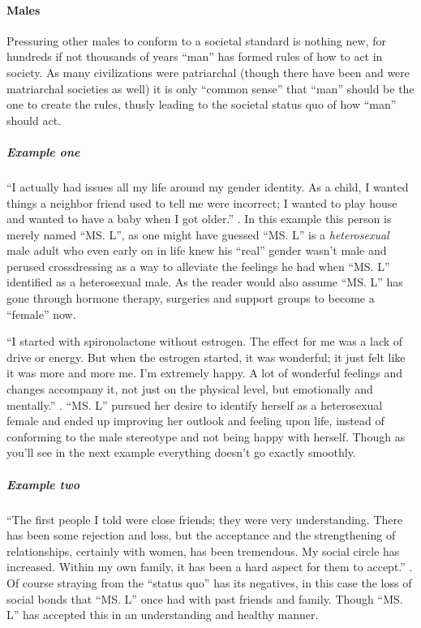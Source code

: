 \paragraph{Males}
Pressuring other males to conform to a societal standard is nothing new, for
hundreds if not thousands of years ``man'' has formed rules of how to act in
society. As many civilizations were patriarchal (though there have been and were
matriarchal societies as well) it is only ``common sense'' that ``man'' should
be the one to create the rules, thusly leading to the societal status quo of how
``man'' should act.
\par

\subparagraph{Example one}
``I actually had issues all my life around my gender identity. As a child,
I wanted things a neighbor friend used to tell me were incorrect; I wanted to
play house and wanted to have a baby when I got older.'' \cite[p.~478]{MOT}.
In this example this person is merely named ``MS. L'', as one might have guessed
``MS. L'' is a \textit{heterosexual} male adult who even early on in life knew his
``real'' gender wasn't male and perused crossdressing as a way to alleviate the
feelings he had when ``MS. L'' identified as a heterosexual male. As the reader
would also assume ``MS. L'' has gone through hormone therapy, surgeries and
support groups to become a ``female'' now.
\newpage

``I started with spironolactone without estrogen. The effect for me was a lack
of drive or energy. But when the estrogen started, it was wonderful; it just
felt like it was more and more me. I’m extremely happy. A lot of wonderful
feelings and changes accompany it, not just on the physical level, but
emotionally and mentally.'' \cite[p.~479]{MOT} . ``MS. L'' pursued her desire to
identify herself as a heterosexual female and ended up improving her outlook and
feeling upon life, instead of conforming to the male stereotype and not being
happy with herself. Though as you'll see in the next example everything doesn't
go exactly smoothly.
\par

\subparagraph{Example two}
``The first people I told were close friends; they were very understanding.
There has been some rejection and loss, but the acceptance and the strengthening
of relationships, certainly with women, has been tremendous. My social circle
has increased. Within my own family, it has been a hard aspect for them to
accept.'' \cite[p.~478-479]{MOT} . Of course straying from the ``status quo''
has its negatives, in this case the loss of social bonds that ``MS. L'' once had
with past friends and family. Though ``MS. L'' has accepted this in an
understanding and healthy manner.
\par

